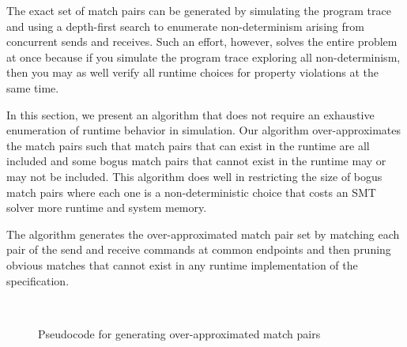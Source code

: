 The exact set of match pairs can be generated by simulating the
program trace and using a depth-first search to enumerate
non-determinism arising from concurrent sends and receives. Such an
effort, however, solves the entire problem at once because if you
simulate the program trace exploring all non-determinism, then you may
as well verify all runtime choices for property violations at the same
time.

In this section, we present an algorithm that does not require
an exhaustive enumeration of runtime behavior in simulation. Our
algorithm over-approximates the match pairs such that match pairs that
can exist in the runtime are all included and some bogus match
pairs that cannot exist in the runtime may or may not be included. This algorithm does well in restricting the size of bogus match pairs where each one is a non-deterministic choice that costs an SMT solver more runtime and system memory.


The algorithm generates the over-approximated match pair set by
matching each pair of the send and receive commands at common
endpoints and then pruning obvious matches that cannot exist in any
runtime implementation of the specification.   

\begin{figure}[h]
\setlength{\tabcolsep}{20pt}
\begin{center}
\scalebox{0.7}{\usebox{\boxalgorithm}}\\
\end{center}
\caption{Pseudocode for generating over-approximated match pairs}
\label{fig:pseudocode}
\end{figure}

